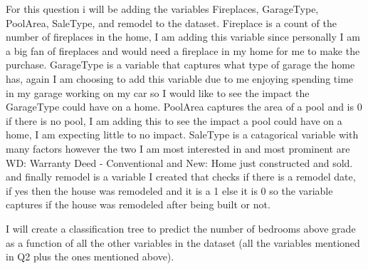 \documentclass[
]{article}
\newenvironment{Shaded}{\begin{snugshade}}{\end{snugshade}}
\newcommand{\AttributeTok}[1]{\textcolor[rgb]{0.13,0.29,0.53}{#1}}
\newcommand{\DecValTok}[1]{\textcolor[rgb]{0.00,0.00,0.81}{#1}}
\newcommand{\FunctionTok}[1]{\textcolor[rgb]{0.13,0.29,0.53}{\textbf{#1}}}
\newcommand{\NormalTok}[1]{#1}
\newcommand{\OtherTok}[1]{\textcolor[rgb]{0.56,0.35,0.01}{#1}}
\newcommand{\SpecialCharTok}[1]{\textcolor[rgb]{0.81,0.36,0.00}{\textbf{#1}}}
\newcommand{\StringTok}[1]{\textcolor[rgb]{0.31,0.60,0.02}{#1}}
\begin{document}
For this question i will be adding the variables Fireplaces, GarageType,
PoolArea, SaleType, and remodel to the dataset. Fireplace is a count of
the number of fireplaces in the home, I am adding this variable since
personally I am a big fan of fireplaces and would need a fireplace in my
home for me to make the purchase. GarageType is a variable that captures
what type of garage the home has, again I am choosing to add this
variable due to me enjoying spending time in my garage working on my car
so I would like to see the impact the GarageType could have on a home.
PoolArea captures the area of a pool and is 0 if there is no pool, I am
adding this to see the impact a pool could have on a home, I am
expecting little to no impact. SaleType is a catagorical variable with
many factors however the two I am most interested in and most prominent
are WD: Warranty Deed - Conventional and New: Home just constructed and
sold. and finally remodel is a variable I created that checks if there
is a remodel date, if yes then the house was remodeled and it is a 1
else it is 0 so the variable captures if the house was remodeled after
being built or not.

I will create a classification tree to predict the number of bedrooms
above grade as a function of all the other variables in the dataset (all
the variables mentioned in Q2 plus the ones mentioned above).

\begin{Shaded}
\end{Shaded}
\end{document}
